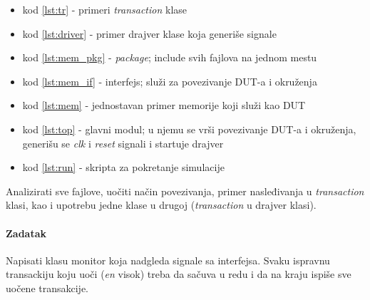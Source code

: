 \begin{itemize}
\item kod \ref{lst:tr} - primeri \emph{transaction} klase
\item kod \ref{lst:driver} - primer drajver klase koja generiše signale
\item kod \ref{lst:mem_pkg} - \emph{package}; include svih fajlova na jednom mestu
\item kod \ref{lst:mem_if} - interfejs; služi za povezivanje DUT-a i okruženja
\item kod \ref{lst:mem} - jednostavan primer memorije koji služi kao DUT
\item kod \ref{lst:top} - glavni modul; u njemu se vrši povezivanje DUT-a i
  okruženja, generišu se \emph{clk} i \emph{reset} signali i startuje drajver
\item kod \ref{lst:run} - skripta za pokretanje simulacije
\end{itemize}

Analizirati sve fajlove, uočiti način povezivanja, primer nasleđivanja u
\emph{transaction} klasi, kao i upotrebu jedne klase u drugoj
(\emph{transaction} u drajver klasi).









\paragraph{Zadatak}

Napisati klasu monitor koja nadgleda signale sa interfejsa. Svaku ispravnu
transackiju koju uoči (\emph{en} visok) treba da sačuva u redu i da na kraju ispiše
sve uočene transakcije.

